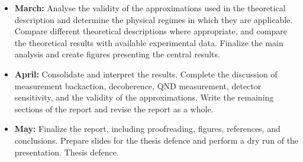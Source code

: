 \begin{itemize}
    \item \textbf{March:} Analyse the validity of the approximations used in the theoretical description and determine the physical regimes in which they are applicable. Compare different theoretical descriptions where appropriate, and compare the theoretical results with available experimental data. Finalize the main analysis and create figures presenting the central results.

    \item \textbf{April:} Consolidate and interpret the results. Complete the discussion of measurement backaction, decoherence, QND measurement, detector sensitivity, and the validity of the approximations. Write the remaining sections of the report and revise the report as a whole.

    \item \textbf{May:} Finalize the report, including proofreading, figures, references, and conclusions. Prepare slides for the thesis defence and perform a dry run of the presentation. Thesis defence.
\end{itemize}